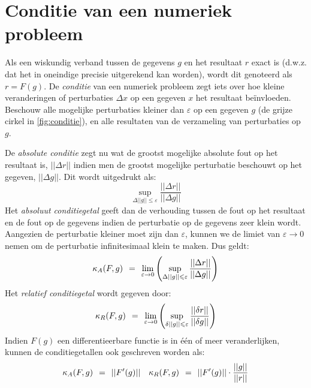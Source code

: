 \documentclass[11pt]{report}
\def \eq {\hspace{1.5mm}=\hspace{1.5mm}}
\begin{document}
	\section{Conditie van een numeriek probleem}
		Als een wiskundig verband tussen de gegevens $g$ en het resultaat $r$ exact is (d.w.z. dat het in oneindige precisie uitgerekend kan worden), wordt dit genoteerd als $r = F(g)$. De \textit{conditie} van een numeriek probleem zegt iets over hoe kleine veranderingen of perturbaties $\Delta x$ op een gegeven $x$ het resultaat be\"{i}nvloeden. Beschouw alle mogelijke perturbaties kleiner dan $\varepsilon$ op een gegeven $g$ (de grijze cirkel in \ref{fig:conditie}), en alle resultaten van de verzameling van perturbaties op $g$. \\
		\begin{figure*}[h]
			\centering
			\caption{De conditie van een numeriek probleem}
			\label{fig:conditie}
		\end{figure*}
		De \textit{absolute conditie} zegt nu wat de grootst mogelijke absolute fout op het resultaat is, $||\Delta r||$ indien men de grootst mogelijke perturbatie beschouwt op het gegeven, $||\Delta g||$. Dit wordt uitgedrukt als:
		$$\sup_{\Delta ||g|| \leqslant \varepsilon} \frac{||\Delta r||}{||\Delta g||}$$
		Het \textit{absoluut conditiegetal} geeft dan de verhouding tussen de fout op het resultaat en de fout op de gegevens indien de perturbatie op de gegevens zeer klein wordt. Aangezien de perturbatie kleiner moet zijn dan $\varepsilon$, kunnen we de limiet van $\varepsilon \to 0$ nemen om de perturbatie infinitesimaal klein te maken. Dus geldt:
		\begin{equation}
			\kappa_A(F, g) \eq \lim_{\varepsilon \to 0} \left(\sup_{\Delta ||g|| \leqslant \varepsilon} \frac{||\Delta r||}{||\Delta g||}\right)
		\end{equation}
		Het \textit{relatief conditiegetal} wordt gegeven door:
		\begin{equation}
			\kappa_R(F, g) \eq \lim_{\varepsilon \to 0} \left(\sup_{\delta ||g|| \leqslant \varepsilon} \frac{||\delta r||}{||\delta g||}\right)
		\end{equation}
		Indien $F(g)$ een differentieerbare functie is in \'{e}\'{e}n of meer veranderlijken, kunnen de conditiegetallen ook geschreven worden als:
		\begin{align}
			\kappa_A(F, g) \eq ||F'(g)|| & & \kappa_R(F, g) \eq ||F'(g)|| \cdot \frac{||g||}{||r||}
		\end{align}
		
\end{document}
